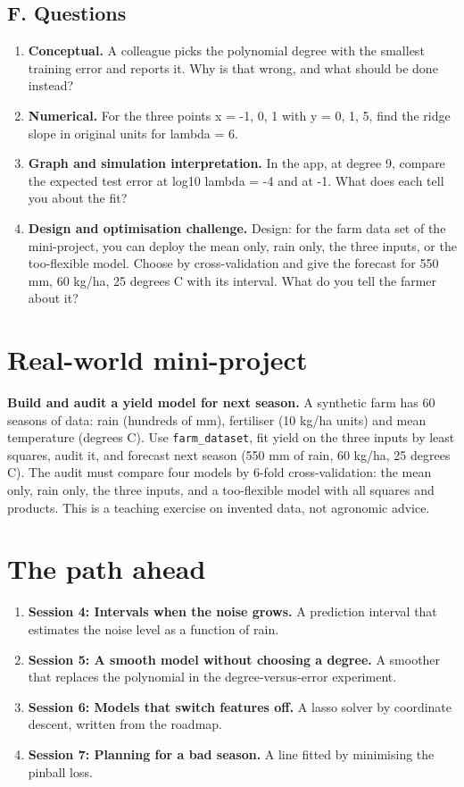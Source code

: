 \documentclass[11pt,a4paper]{article}
\begin{document}
\subsection*{F. Questions}
\begin{enumerate}[nosep]
\item \textbf{Conceptual.} A colleague picks the polynomial degree with the smallest training error and reports it. Why is that wrong, and what should be done instead?
\item \textbf{Numerical.} For the three points x = -1, 0, 1 with y = 0, 1, 5, find the ridge slope in original units for lambda = 6.
\item \textbf{Graph and simulation interpretation.} In the app, at degree 9, compare the expected test error at log10 lambda = -4 and at -1. What does each tell you about the fit?
\item \textbf{Design and optimisation challenge.} Design: for the farm data set of the mini-project, you can deploy the mean only, rain only, the three inputs, or the too-flexible model. Choose by cross-validation and give the forecast for 550 mm, 60 kg/ha, 25 degrees C with its interval. What do you tell the farmer about it?
\end{enumerate}

\section{Real-world mini-project}
\textbf{Build and audit a yield model for next season.} A synthetic farm has 60 seasons of data: rain (hundreds of mm), fertiliser (10 kg/ha units) and mean temperature (degrees C). Use \texttt{farm\_dataset}, fit yield on the three inputs by least squares, audit it, and forecast next season (550 mm of rain, 60 kg/ha, 25 degrees C). The audit must compare four models by 6-fold cross-validation: the mean only, rain only, the three inputs, and a too-flexible model with all squares and products. This is a teaching exercise on invented data, not agronomic advice.

\section{The path ahead}
\begin{enumerate}[nosep]
\item \textbf{Session 4: Intervals when the noise grows.} A prediction interval that estimates the noise level as a function of rain.
\item \textbf{Session 5: A smooth model without choosing a degree.} A smoother that replaces the polynomial in the degree-versus-error experiment.
\item \textbf{Session 6: Models that switch features off.} A lasso solver by coordinate descent, written from the roadmap.
\item \textbf{Session 7: Planning for a bad season.} A line fitted by minimising the pinball loss.
\end{enumerate}
\end{document}
